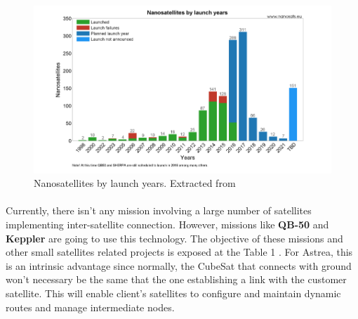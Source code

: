 \begin{figure}[H]
\centering
\includegraphics[scale=0.4]{img/launches.png}
\caption{Nanosatellites by launch years. Extracted from \cite{nanosats}}
\label{launches}
\end{figure}


\paragraph{}
Currently, there isn't any mission involving a large number of satellites implementing inter-satellite connection. However, missions like \textbf{QB-50} and \textbf{Keppler} are going to use this technology. The objective of these missions and other small satellites related projects is exposed at the Table 1
. For Astrea, this is an intrinsic advantage since normally, the CubeSat that connects with ground won't necessary be the same that the one establishing a link with the customer satellite. This will enable client's satellites to configure and maintain dynamic routes and manage intermediate nodes.

